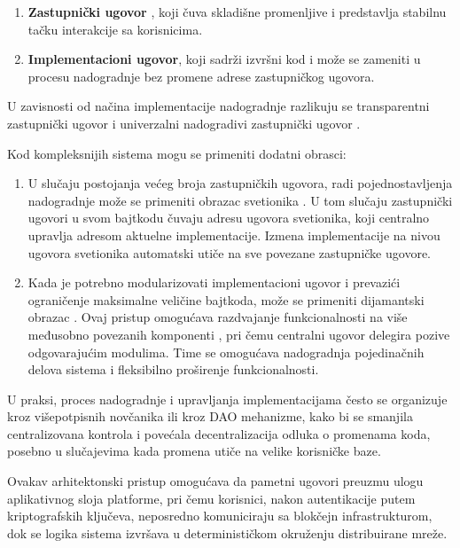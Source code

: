\begin{enumerate}
\item \textbf{Zastupnički ugovor} \cite{PROXYeip1967}, koji čuva skladišne promenljive i predstavlja stabilnu tačku interakcije sa korisnicima.
\item \textbf{Implementacioni ugovor}, koji sadrži izvršni kod i može se zameniti u procesu nadogradnje bez promene adrese zastupničkog ugovora.
\end{enumerate}
U zavisnosti od načina implementacije nadogradnje razlikuju se transparentni zastupnički ugovor  i univerzalni nadogradivi zastupnički ugovor .

Kod kompleksnijih sistema mogu se primeniti dodatni obrasci:
\begin{enumerate}
\item U slučaju postojanja većeg broja zastupničkih ugovora, radi pojednostavljenja nadogradnje može se primeniti obrazac svetionika . U tom slučaju zastupnički ugovori u svom bajtkodu čuvaju adresu ugovora svetionika, koji centralno upravlja adresom aktuelne implementacije. Izmena implementacije na nivou ugovora svetionika automatski utiče na sve povezane zastupničke ugovore.

\item Kada je potrebno modularizovati implementacioni ugovor i prevazići ograničenje maksimalne veličine bajtkoda, može se primeniti dijamantski obrazac \cite{DIAMONDeip2535} . Ovaj pristup omogućava razdvajanje funkcionalnosti na više međusobno povezanih komponenti , pri čemu centralni ugovor  delegira pozive odgovarajućim modulima. Time se omogućava nadogradnja pojedinačnih delova sistema i fleksibilno proširenje funkcionalnosti.
\end{enumerate}

U praksi, proces nadogradnje i upravljanja implementacijama često se organizuje kroz višepotpisnih novčanika ili kroz DAO mehanizme, kako bi se smanjila centralizovana kontrola i povećala decentralizacija odluka o promenama koda, posebno u slučajevima kada promena utiče na velike korisničke baze.

Ovakav arhitektonski pristup omogućava da pametni ugovori preuzmu ulogu aplikativnog sloja platforme, pri čemu korisnici, nakon autentikacije putem kriptografskih ključeva, neposredno komuniciraju sa blokčejn infrastrukturom, dok se logika sistema izvršava u determinističkom okruženju distribuirane mreže.

